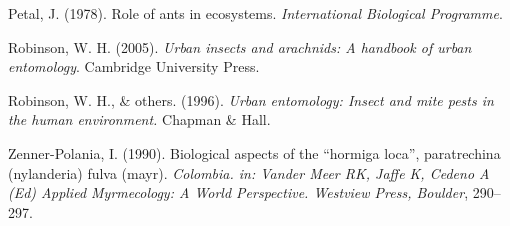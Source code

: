 \documentclass[11pt,]{article}
\begin{document}
\hypertarget{ref-petal1978role}{}
Petal, J. (1978). Role of ants in ecosystems. \emph{International
Biological Programme}.

\hypertarget{ref-robinson2005urban}{}
Robinson, W. H. (2005). \emph{Urban insects and arachnids: A handbook of
urban entomology}. Cambridge University Press.

\hypertarget{ref-robinson1996urban}{}
Robinson, W. H., \& others. (1996). \emph{Urban entomology: Insect and
mite pests in the human environment.} Chapman \& Hall.

\hypertarget{ref-zenner1990biological}{}
Zenner-Polania, I. (1990). Biological aspects of the ``hormiga loca'',
paratrechina (nylanderia) fulva (mayr). \emph{Colombia. in: Vander Meer
RK, Jaffe K, Cedeno A (Ed) Applied Myrmecology: A World Perspective.
Westview Press, Boulder}, 290--297.




\newpage
\singlespacing 
\end{document}
